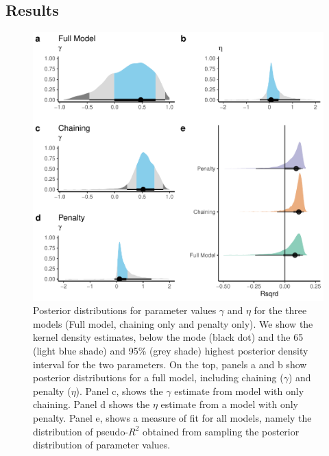 \documentclass[10pt,letterpaper]{article}
\begin{document}
\hypertarget{results}{%
\subsection{Results}\label{results}}

\begin{figure}
\includegraphics[width=1\linewidth]{manuscript_PLOS_files/figure-latex/post-1} \caption{Posterior distributions for parameter values $\gamma$ and $\eta$ for the three models (Full model, chaining only and penalty only). We show the kernel density estimates, below the mode (black dot) and the 65 (light blue shade) and 95\% (grey shade)  highest posterior density interval for the two parameters. On the top, panels a and b show posterior distributions for a full model, including chaining ($\gamma$) and penalty ($\eta$). Panel c, shows the $\gamma$ estimate from model with only chaining. Panel d shows the $\eta$ estimate from a model with only penalty. Panel e, shows a measure of fit for all models, namely the distribution of pseudo-$R^2$ obtained from sampling the posterior distribution of parameter values.}\label{fig:post}
\end{figure}
\end{document}

